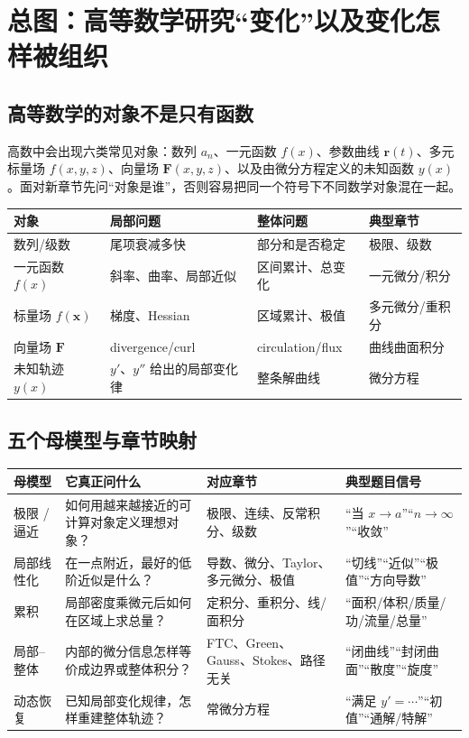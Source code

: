 \documentclass[11pt,a4paper,openany]{ctexbook}
\begin{document}
\chapter{总图：高等数学研究“变化”以及变化怎样被组织}
\section{高等数学的对象不是只有函数}
高数中会出现六类常见对象：数列 $a_n$、一元函数 $f(x)$、参数曲线 $\bm r(t)$、多元标量场 $f(x,y,z)$、向量场 $\bm F(x,y,z)$、以及由微分方程定义的未知函数 $y(x)$。面对新章节先问“对象是谁”，否则容易把同一个符号下不同数学对象混在一起。
\begin{longtable}{L{3.0cm}L{4.0cm}L{4.2cm}L{\dimexpr\linewidth-12.47cm\relax}}
\toprule
\textbf{对象} & \textbf{局部问题} & \textbf{整体问题} & \textbf{典型章节}\\\midrule
数列/级数 & 尾项衰减多快 & 部分和是否稳定 & 极限、级数\\
一元函数 $f(x)$ & 斜率、曲率、局部近似 & 区间累计、总变化 & 一元微分/积分\\
标量场 $f(\bm x)$ & 梯度、Hessian & 区域累计、极值 & 多元微分/重积分\\
向量场 $\bm F$ & divergence/curl & circulation/flux & 曲线曲面积分\\
未知轨迹 $y(x)$ & $y'$、$y''$ 给出的局部变化律 & 整条解曲线 & 微分方程\\
\bottomrule\end{longtable}

\section{五个母模型与章节映射}
\begin{longtable}{L{2.6cm}L{4.5cm}L{4.1cm}L{\dimexpr\linewidth-12.47cm\relax}}
\toprule\textbf{母模型}&\textbf{它真正问什么}&\textbf{对应章节}&\textbf{典型题目信号}\\\midrule
极限 / 逼近 & 如何用越来越接近的可计算对象定义理想对象？ & 极限、连续、反常积分、级数 & “当 $x\to a$”“$n\to\infty$”“收敛”\\
局部线性化 & 在一点附近，最好的低阶近似是什么？ & 导数、微分、Taylor、多元微分、极值 & “切线”“近似”“极值”“方向导数”\\
累积 & 局部密度乘微元后如何在区域上求总量？ & 定积分、重积分、线/面积分 & “面积/体积/质量/功/流量/总量”\\
局部--整体 & 内部的微分信息怎样等价成边界或整体积分？ & FTC、Green、Gauss、Stokes、路径无关 & “闭曲线”“封闭曲面”“散度”“旋度”\\
动态恢复 & 已知局部变化规律，怎样重建整体轨迹？ & 常微分方程 & “满足 $y'=\cdots$”“初值”“通解/特解”\\
\bottomrule\end{longtable}
\end{document}
